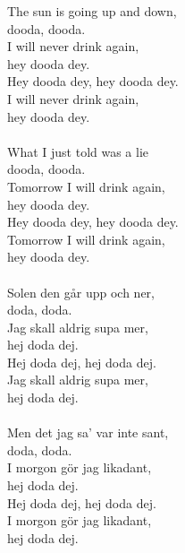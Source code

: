 
The sun is going up and down, \\ dooda, dooda. \\ I will never drink again, \\ hey dooda dey. \\ Hey dooda dey, hey dooda dey. \\ I will never drink again, \\ hey dooda dey. \\ \hspace{10mm} \\ What I just told was a lie \\ dooda, dooda. \\ Tomorrow I will drink again, \\ hey dooda dey. \\ Hey dooda dey, hey dooda dey. \\ Tomorrow I will drink again, \\ hey dooda dey. \\ \hspace{10mm} \\ Solen den går upp och ner, \\ doda, doda. \\ Jag skall aldrig supa mer, \\ hej doda dej. \\ Hej doda dej, hej doda dej. \\ Jag skall aldrig supa mer, \\ hej doda dej. \\ \hspace{10mm} \\ Men det jag sa' var inte sant, \\ doda, doda. \\ I morgon gör jag likadant, \\ hej doda dej. \\ Hej doda dej, hej doda dej. \\ I morgon gör jag likadant, \\ hej doda dej.